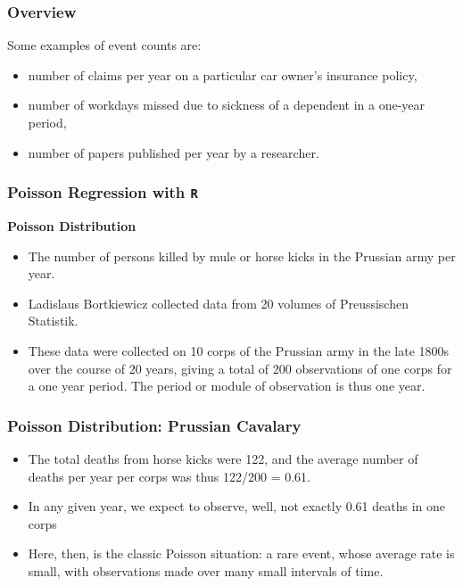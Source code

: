 \documentclass[MASTER.tex]{subfiles}
\begin{document}
\begin{frame}
	\frametitle{Overview}
	\Large Some
examples of event counts are:
\begin{itemize}
\item number of claims per year on a particular car owner’s insurance policy,
\item number of workdays missed due to sickness of a dependent in a one-year period,
\item number of papers published per year by a researcher.
\end{itemize}
\end{frame}
\begin{frame}[fragile]
	
	\frametitle{Poisson Regression with \texttt{R} } 
	\Large	
	\textbf{Poisson Distribution} 
	
	\begin{itemize}
		\item The number of persons killed by mule or horse kicks in the Prussian army per year. 
		\item Ladislaus Bortkiewicz collected data from 20 volumes of Preussischen Statistik. 
		\item These data were collected on 10 corps of the Prussian army in the late 1800s over the course of 20 years, giving a total of 200 observations of one corps for a one year period. The period or module of observation is thus one year. 
		
	\end{itemize}
	
\end{frame}

\begin{frame}
	\frametitle{Poisson Distribution: Prussian Cavalary}
	\Large
	\begin{itemize}
\item The total deaths from horse kicks were 122, and the average number of deaths per year per corps was thus 122/200 = 0.61. 
\item In any given year, we expect to observe, well, not exactly 0.61 deaths in one corps 
\item Here, then, is the classic Poisson situation: a rare event, whose average rate is small, with observations made over many small intervals of time.
\end{itemize}
\end{frame}
\end{document}
